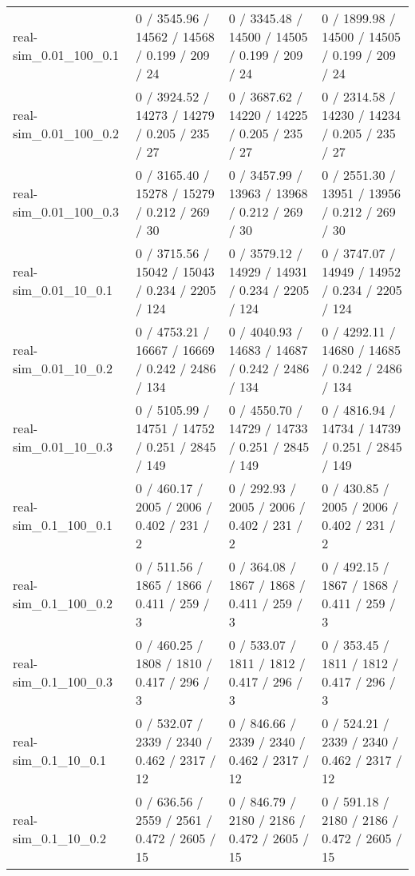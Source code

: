 \begin{tabular}{llll}
     real-sim\_0.01\_100\_0.1 &   0 / 3545.96 /  14562 /   14568 / 0.199 /    209 /     24 &   0 / 3345.48 /  14500 /   14505 / 0.199 /    209 /     24 &   0 / 1899.98 /  14500 /   14505 / 0.199 /    209 /     24 \\
     real-sim\_0.01\_100\_0.2 &   0 / 3924.52 /  14273 /   14279 / 0.205 /    235 /     27 &   0 / 3687.62 /  14220 /   14225 / 0.205 /    235 /     27 &   0 / 2314.58 /  14230 /   14234 / 0.205 /    235 /     27 \\
     real-sim\_0.01\_100\_0.3 &   0 / 3165.40 /  15278 /   15279 / 0.212 /    269 /     30 &   0 / 3457.99 /  13963 /   13968 / 0.212 /    269 /     30 &   0 / 2551.30 /  13951 /   13956 / 0.212 /    269 /     30 \\
      real-sim\_0.01\_10\_0.1 &   0 / 3715.56 /  15042 /   15043 / 0.234 /   2205 /    124 &   0 / 3579.12 /  14929 /   14931 / 0.234 /   2205 /    124 &   0 / 3747.07 /  14949 /   14952 / 0.234 /   2205 /    124 \\
      real-sim\_0.01\_10\_0.2 &   0 / 4753.21 /  16667 /   16669 / 0.242 /   2486 /    134 &   0 / 4040.93 /  14683 /   14687 / 0.242 /   2486 /    134 &   0 / 4292.11 /  14680 /   14685 / 0.242 /   2486 /    134 \\
      real-sim\_0.01\_10\_0.3 &   0 / 5105.99 /  14751 /   14752 / 0.251 /   2845 /    149 &   0 / 4550.70 /  14729 /   14733 / 0.251 /   2845 /    149 &   0 / 4816.94 /  14734 /   14739 / 0.251 /   2845 /    149 \\
      real-sim\_0.1\_100\_0.1 &    0 / 460.17 /   2005 /    2006 / 0.402 /    231 /      2 &    0 / 292.93 /   2005 /    2006 / 0.402 /    231 /      2 &    0 / 430.85 /   2005 /    2006 / 0.402 /    231 /      2 \\
      real-sim\_0.1\_100\_0.2 &    0 / 511.56 /   1865 /    1866 / 0.411 /    259 /      3 &    0 / 364.08 /   1867 /    1868 / 0.411 /    259 /      3 &    0 / 492.15 /   1867 /    1868 / 0.411 /    259 /      3 \\
      real-sim\_0.1\_100\_0.3 &    0 / 460.25 /   1808 /    1810 / 0.417 /    296 /      3 &    0 / 533.07 /   1811 /    1812 / 0.417 /    296 /      3 &    0 / 353.45 /   1811 /    1812 / 0.417 /    296 /      3 \\
       real-sim\_0.1\_10\_0.1 &    0 / 532.07 /   2339 /    2340 / 0.462 /   2317 /     12 &    0 / 846.66 /   2339 /    2340 / 0.462 /   2317 /     12 &    0 / 524.21 /   2339 /    2340 / 0.462 /   2317 /     12 \\
       real-sim\_0.1\_10\_0.2 &    0 / 636.56 /   2559 /    2561 / 0.472 /   2605 /     15 &    0 / 846.79 /   2180 /    2186 / 0.472 /   2605 /     15 &    0 / 591.18 /   2180 /    2186 / 0.472 /   2605 /     15 \\

\end{tabular}
